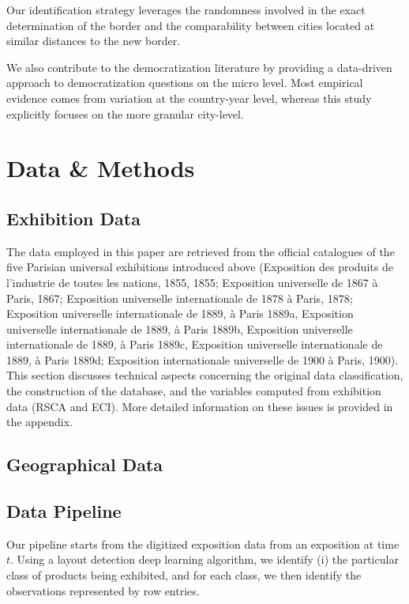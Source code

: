 Our identification strategy leverages the randomness involved in the exact determination of the border and the comparability between cities located at similar distances to the new border. 

We also contribute to the democratization literature by providing a data-driven approach to democratization questions on the micro level. Most empirical evidence comes from variation at the country-year level, whereas this study explicitly focuses on the more granular city-level. 


\section{Data \& Methods}

\subsection{Exhibition Data} 
The data employed in this paper are retrieved from the official catalogues of the five Parisian universal exhibitions introduced above (Exposition des produits de l’industrie de toutes les nations, 1855, 1855; Exposition universelle de 1867 à Paris, 1867; Exposition universelle internationale de 1878 à Paris, 1878; Exposition universelle internationale de 1889, à Paris 1889a, Exposition universelle internationale de 1889, à Paris 1889b, Exposition universelle internationale de 1889, à Paris 1889c, Exposition universelle internationale de 1889, à Paris 1889d; Exposition internationale universelle de 1900 à Paris, 1900). This section discusses technical aspects concerning the original data classification, the construction of the database, and the variables computed from exhibition data (RSCA and ECI). More detailed information on these issues is provided in the appendix.

\subsection{Geographical Data}

\subsection{Data Pipeline}



Our pipeline starts from the digitized exposition data from an exposition at time $t$. Using a layout detection deep learning algorithm, we identify (i) the particular class of products being exhibited, and for each class, we then identify the observations represented by row entries. 

